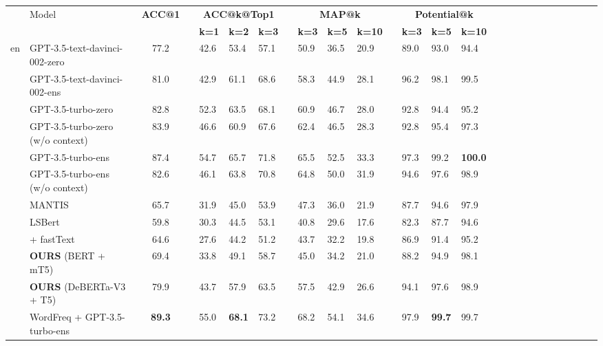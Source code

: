 \documentclass[11pt]{article}
\begin{document}
\begin{table*}[t!]
\begin{center}
\begin{adjustbox}{max width=\textwidth}
\begin{tabular}{llclllllllllllllllllllllll}
\toprule
&\multirow{2}{*}{Model}
&\multirow{2}{*}{\textbf{ACC@1}}
&&\multicolumn{3}{c}{\textbf{ACC@k@Top1}}
&&\multicolumn{3}{c}{\textbf{MAP@k}}
&&\multicolumn{3}{c}{{\textbf{Potential@k}}}\\
  \cmidrule{5-7}
  \cmidrule{9-11}
  \cmidrule{13-15}
&
&
&&\multicolumn{1}{c}{\textbf{k=1}}&\multicolumn{1}{c}{\textbf{k=2}}&\multicolumn{1}{c}{\textbf{k=3}}
&&\multicolumn{1}{c}{\textbf{k=3}}&\multicolumn{1}{c}{\textbf{k=5}}&\multicolumn{1}{c}{\textbf{k=10}}
&&\multicolumn{1}{c}{\textbf{k=3}}&\multicolumn{1}{c}{\textbf{k=5}}&\multicolumn{1}{c}{\textbf{k=10}}
\\

  
  \midrule
\multirow{13}{*}{en}&GPT-3.5-text-davinci-002-zero
&77.2&&42.6&53.4&57.1&&50.9&36.5&20.9&&89.0&93.0&94.4
\\
&GPT-3.5-text-davinci-002-ens
&81.0&&42.9&61.1&68.6&&58.3&44.9&28.1&&96.2&98.1&99.5\\

&GPT-3.5-turbo-zero
&82.8&&52.3&63.5&68.1&&60.9&46.7&28.0&&92.8&94.4&95.2
\\

&GPT-3.5-turbo-zero (w/o context)
&83.9&&46.6&60.9&67.6&&62.4&46.5&28.3&&92.8&95.4&97.3
\\

&GPT-3.5-turbo-ens
&87.4&&54.7&65.7&71.8&&65.5&52.5&33.3&&97.3&99.2&\textbf{100.0}\\

&GPT-3.5-turbo-ens (w/o context)
&82.6&&46.1&63.8&70.8&&64.8&50.0&31.9&&94.6&97.6&98.9\\

&MANTIS
&65.7&&31.9&45.0&53.9&&47.3&36.0&21.9&&87.7&94.6&97.9\\
&LSBert 
&59.8&&30.3&44.5&53.1&&40.8&29.6&17.6&&82.3&87.7&94.6\\
&\citet{wada-etal-2022-unsupervised} + fastText
&64.6&&27.6&44.2&51.2&&43.7&32.2&19.8&&86.9&91.4&95.2\\

&\textbf{OURS} (BERT + mT5)
&69.4&&33.8&49.1&58.7&&45.0&34.2&21.0&&88.2&94.9&98.1\\

&\textbf{OURS}  (DeBERTa-V3 + T5)
&79.9&&43.7&57.9&63.5&&57.5&42.9&26.6&&94.1&97.6&98.9\\\midrule
&WordFreq + GPT-3.5-turbo-ens
&\textbf{89.3}&&55.0&\textbf{68.1}&73.2&&68.2&54.1&34.6&&97.9&\textbf{99.7}&99.7\\



\end{tabular}
\end{adjustbox}
\end{center}
\end{table*}
\end{document}
